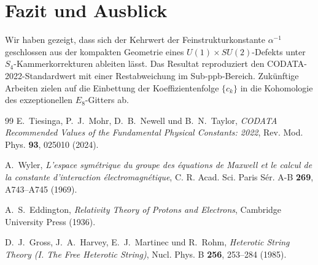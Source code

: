 \documentclass[11pt,a4paper]{article}
\begin{document}
\section{Fazit und Ausblick}
Wir haben gezeigt, dass sich der Kehrwert der Feinstrukturkonstante $\alpha^{-1}$ geschlossen aus der kompakten Geometrie eines $U(1) \times SU(2)$-Defekts unter $S_4$-Kammerkorrekturen ableiten lässt. Das Resultat reproduziert den CODATA-2022-Standardwert mit einer Restabweichung im Sub-ppb-Bereich. Zukünftige Arbeiten zielen auf die Einbettung der Koeffizientenfolge $\{c_k\}$ in die Kohomologie des exzeptionellen $E_8$-Gitters ab.

\begin{thebibliography}{99}
E.~Tiesinga, P.~J.~Mohr, D.~B.~Newell und B.~N.~Taylor,
\textit{CODATA Recommended Values of the Fundamental Physical Constants: 2022},
Rev. Mod. Phys. \textbf{93}, 025010 (2024).

A.~Wyler,
\textit{L'espace symétrique du groupe des équations de Maxwell et le calcul de la constante d'interaction électromagnétique},
C. R. Acad. Sci. Paris Sér. A-B \textbf{269}, A743--A745 (1969).

A.~S.~Eddington,
\textit{Relativity Theory of Protons and Electrons},
Cambridge University Press (1936).

D.~J.~Gross, J.~A.~Harvey, E.~J.~Martinec und R.~Rohm,
\textit{Heterotic String Theory (I. The Free Heterotic String)},
Nucl. Phys. B \textbf{256}, 253--284 (1985).
\end{thebibliography}
\end{document}
